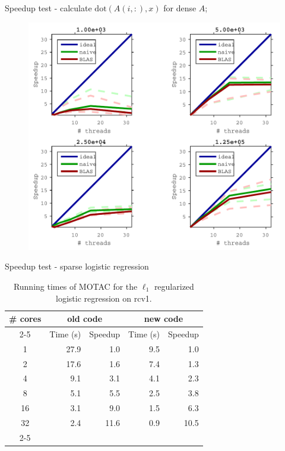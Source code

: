 \documentclass[hyperref,handout,compress,9pt,mathserif]{beamer}
\begin{document}
\begin{frame}{Speedup test - calculate $\text{dot}(A(i, :), x)$ for dense $A$;}
\begin{figure}[!h]
        \centering
                \includegraphics[width=.8\textwidth]{./figs/sp_mtx_ds_vec_speedup_cropped.pdf}
\end{figure}
\end{frame}




\begin{frame}{Speedup test - sparse logistic regression}
\begin{table}[htbp]
\centering
 {\small  \begin{tabular}{|c|r|r|r|r|}
  \hline
  \multirow{3}{*}{\# cores} & \multicolumn{2}{|c|}{old code} & \multicolumn{2}{c|}{new code} \\
  \cline{2-5}
  &Time (s) & Speedup & Time (s) & Speedup\\
  \hline
  1&27.9 & 1.0 & 9.5& 1.0\\
  2 &17.6& 1.6  &  7.4& 1.3\\
  4& 9.1& 3.1  & 4.1& 2.3\\
  8& 5.1 &5.5 & 2.5& 3.8\\
  16&3.1 &9.0 & 1.5&  6.3 \\
  32 &2.4 &11.6 & 0.9& 10.5\\
  \cline{2-5}
  \hline
  
  \hline
 \end{tabular} }
  \caption{\label{tab:log_time}Running times of  MOTAC for the $\ell_1$ regularized logistic regression on rcv1.}
 \end{table}


\end{frame}
\end{document}
